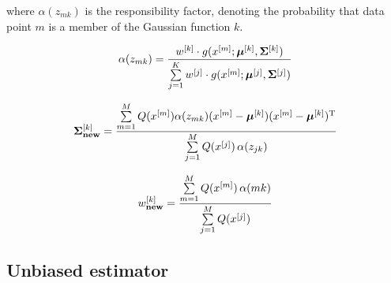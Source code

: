 where $\alpha(z_{mk})$ is the responsibility factor, denoting the probability that data point $m$ is a member of the 
Gaussian function $k$.

\begin{equation}
 \alpha(z_{mk}) = \frac{w^{[k]} \cdot g(x^{[m]};\boldsymbol{\mu}^{[k]},\boldsymbol{\Sigma}^{[k]})}{\sum\limits_{j=1}^{K}w^{[j]} \cdot g(x^{[m]};\boldsymbol{\mu}^{[j]},\boldsymbol{\Sigma}^{[j]})}
\end{equation}

\begin{equation}
   \boldsymbol{\Sigma}^{[k]}_{\textrm{\textbf{new}}} = \frac{\sum\limits_{m=1}^{M} Q(x^{[m]}) \alpha(z_{mk}) (x^{[m]} - \boldsymbol{\mu}^{[k]})(x^{[m]} - \boldsymbol{\mu}^{[k]})^{\mathrm{T}} }{ \sum\limits_{j=1}^{M} Q(x^{[j]})\, \alpha(z_{jk}) }
\end{equation}

\begin{equation}
  w^{[k]}_{\textrm{\textbf{new}}} = \frac{\sum\limits_{m=1}^{M} Q(x^{[m]})\, \alpha(mk)}{\sum\limits_{j=1}^{M} Q(x^{[j]})}
\end{equation}


\subsection{Unbiased estimator}\label{app:unbiased_delta}

